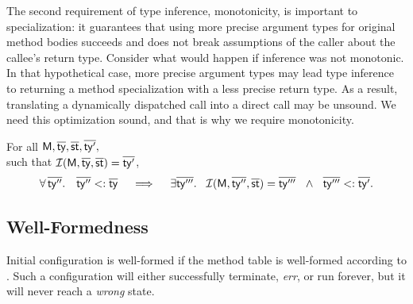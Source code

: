 The second requirement of type inference, monotonicity, is important to specialization:
it guarantees that using more precise argument types for original method
bodies succeeds and does not break assumptions of the caller about
the callee's return type. Consider what would happen if inference was not
monotonic. In that hypothetical case, more precise argument types may lead
type inference to returning
a method specialization with a less precise return type. As a result,
translating a dynamically dispatched call into a direct call may be unsound.
We need this optimization sound, and that is why we require monotonicity.

\begin{requirement}[Monotonicity]\label{prop:ti-monot}
  For all $\mathsf{M}, \overline{\mathsf{ty}},
  \overline{\mathsf{st}}, \overline{\mathsf{ty}'},$\\ such that $\operatorname{\mathcal{I}}(\mathsf{M}, \overline{\mathsf{ty}}, \overline{\mathsf{st}}) = \overline{\mathsf{ty}'}$,
  \[
    \forall\, \overline{\mathsf{ty}''}.\quad \overline{\mathsf{ty}''} <: \overline{\mathsf{ty}}
    \quad \implies \quad
    \exists \overline{\mathsf{ty}'''}.\ \
    \operatorname{\mathcal{I}}(\mathsf{M}, \overline{\mathsf{ty}''}, \overline{\mathsf{st}}) = \overline{\mathsf{ty}'''} \ \ \land\ \
    \overline{\mathsf{ty}'''} <: \overline{\mathsf{ty}'}.
  \]
\end{requirement}

\subsection{Well-Formedness}%
\label{wellform}

Initial \jules configuration \config{\emp\ \main()}{\mtbl} is well-formed
if the method table \mtbl is well-formed according to .
Such a configuration will either successfully terminate, \emph{err},
or run forever, but it will never reach a \emph{wrong} state.

